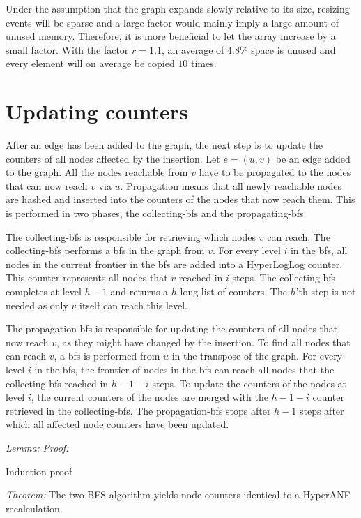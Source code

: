 Under the assumption that the graph expands slowly relative to its size, resizing events will be sparse and a large factor would mainly imply a large amount of unused memory. Therefore, it is more beneficial to let the array increase by a small factor. With the factor $r = 1.1$, an average of $4.8$\% space is unused and every element will on average be copied $10$ times.

\section{Updating counters}

After an edge has been added to the graph, the next step is to update the counters of all nodes affected by the insertion. Let $e = (u,v)$ be an edge added to the graph. All the nodes reachable from $v$ have to be propagated to the nodes that can now reach $v$ via $u$. Propagation means that all newly reachable nodes are hashed and inserted into the counters of the nodes that now reach them. This is performed in two phases, the collecting-bfs and the propagating-bfs.

The collecting-bfs is responsible for retrieving which nodes $v$ can reach. The collecting-bfs performs a bfs in the graph from $v$. For every level $i$ in the bfs, all nodes in the current frontier in the bfs are added into a HyperLogLog counter. This counter represents all nodes that $v$ reached in $i$ steps. The collecting-bfs completes at level $h-1$ and returns a $h$ long list of counters. The $h$'th step is not needed as only $v$ itself can reach this level.

The propagation-bfs is responsible for updating the counters of all nodes that now reach $v$, as they might have changed by the insertion. To find all nodes that can reach $v$, a bfs is performed from $u$ in the transpose of the graph. For every level $i$ in the bfs, the frontier of nodes in the bfs can reach all nodes that the collecting-bfs reached in $h-1-i$ steps. To update the counters of the nodes at level $i$, the current counters of the nodes are merged with the $h-1-i$ counter retrieved in the collecting-bfs. The propagation-bfs stops after $h-1$ steps after which all affected node counters have been updated.

\textit{Lemma: } 
\textit{Proof: }

Induction proof

\textit{Theorem: } The two-BFS algorithm yields node counters identical to a HyperANF recalculation. 

